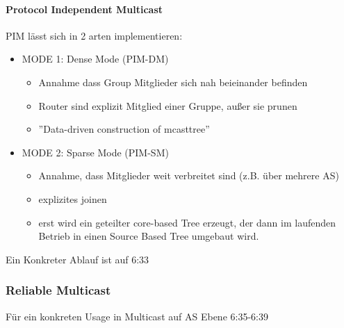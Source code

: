             \paragraph{Protocol Independent Multicast}
                PIM lässt sich in 2 arten implementieren:
                \begin{itemize}
                    \item MODE 1: Dense Mode (PIM-DM)
                        \begin{itemize}
                            \item Annahme dass Group Mitglieder sich nah beieinander befinden 
                            \item Router sind explizit Mitglied einer Gruppe, außer sie prunen
                            \item ''Data-driven construction of mcasttree''
                        \end{itemize}
                    \item MODE 2: Sparse Mode (PIM-SM)
                        \begin{itemize}
                            \item Annahme, dass Mitglieder weit verbreitet sind (z.B. über mehrere AS)
                            \item explizites joinen
                            \item erst wird ein geteilter core-based Tree erzeugt, der dann im laufenden Betrieb in einen Source Based Tree umgebaut wird. 
                        \end{itemize}
                \end{itemize}
                Ein Konkreter Ablauf ist auf 6:33

        \subsubsection{Reliable Multicast}
            Für ein konkreten Usage in Multicast auf AS Ebene 6:35-6:39
                
